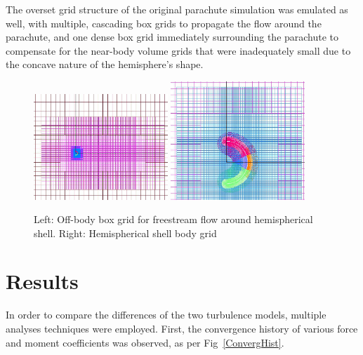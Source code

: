 \documentclass[]{aiaa-tc}%
\begin{document}
The overset grid structure of the original parachute simulation was emulated as well, with multiple, cascading box grids to propagate the flow around the parachute, and one dense box grid immediately surrounding the parachute to compensate for the near-body volume grids that were inadequately small due to the concave nature of the hemisphere's shape.


\begin{figure}[htb!]
\begin{center}
\includegraphics[width=0.45\textwidth]{Images/grid_wake.png}
\includegraphics[width=0.45\textwidth]{Images/grid_body.png}
\caption{Left: Off-body box grid for freestream flow around hemispherical shell.  Right: Hemispherical shell body grid}
\label{BoxGrids}
\end{center}
\end{figure}


\section{Results}

In order to compare the differences of the two turbulence models, multiple analyses techniques were employed.  First, the convergence history of various force and moment coefficients was observed, as per Fig~\ref{ConvergHist}.
\end{document}
